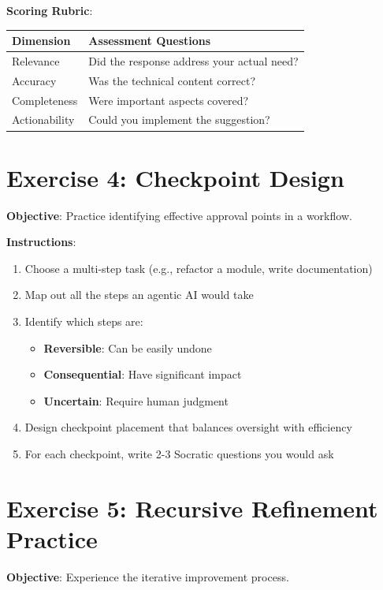 \textbf{Scoring Rubric}:
\begin{table}[H]
\centering
\begin{tabular}{lp{8cm}}
\toprule
\textbf{Dimension} & \textbf{Assessment Questions} \\
\midrule
Relevance & Did the response address your actual need? \\
Accuracy & Was the technical content correct? \\
Completeness & Were important aspects covered? \\
Actionability & Could you implement the suggestion? \\
\bottomrule
\end{tabular}
\end{table}

\section{Exercise 4: Checkpoint Design}

\textbf{Objective}: Practice identifying effective approval points in a workflow.

\textbf{Instructions}:
\begin{enumerate}
    \item Choose a multi-step task (e.g., refactor a module, write documentation)
    \item Map out all the steps an agentic AI would take
    \item Identify which steps are:
    \begin{itemize}
        \item \textbf{Reversible}: Can be easily undone
        \item \textbf{Consequential}: Have significant impact
        \item \textbf{Uncertain}: Require human judgment
    \end{itemize}
    \item Design checkpoint placement that balances oversight with efficiency
    \item For each checkpoint, write 2-3 Socratic questions you would ask
\end{enumerate}

\section{Exercise 5: Recursive Refinement Practice}

\textbf{Objective}: Experience the iterative improvement process.

